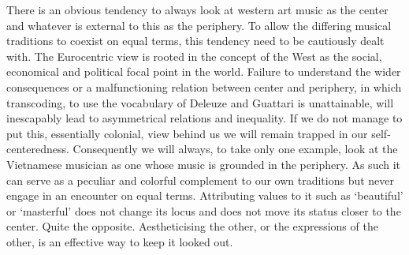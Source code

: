 \documentclass[a4paper]{article}
\begin{document}
There is an obvious tendency to always look at western art music as the center and whatever is external to this as the periphery. To allow the differing musical traditions to coexist on equal terms, this tendency need to be cautiously dealt with. The Eurocentric view is rooted in the concept of the West as the social, economical and political focal point in the world. Failure to understand the wider consequences or a malfunctioning relation between center and periphery, in which transcoding, to use the vocabulary of Deleuze and Guattari is unattainable, will inescapably lead to asymmetrical relations and inequality. If we do not manage to put this, essentially colonial, view behind us we will remain trapped in our self-centeredness. Consequently we will always, to take only one example, look at the Vietnamese musician as one whose music is grounded in the periphery. As such it can serve as a peculiar and colorful complement to our own traditions but never engage in an encounter on equal terms. Attributing values to it such as `beautiful' or `masterful' does not change its locus and does not move its status closer to the center. Quite the opposite. Aestheticising the other, or the expressions of the other, is an effective way to keep it looked out.
\end{document}
